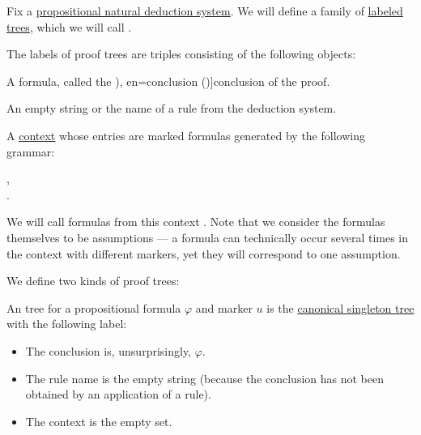 \begin{definition}\label{def:natural_deduction_proof_tree}\mimprovised
  Fix a \hyperref[def:abstract_natural_deduction_system]{propositional natural deduction system}. We will define a family of \hyperref[def:labeled_tree]{labeled trees}, which we will call .

  The labels of proof trees are triples consisting of the following objects:
  \begin{thmenum}[series=def:natural_deduction_proof_tree]
     A formula, called the \term[ru=conclusion (\cite[35]{TroelstraSchwichtenberg2000BasicProofTheory}), en=conclusion (\cite[36]{TroelstraSchwichtenberg2000BasicProofTheory})]{conclusion} of the proof.

     An empty string or the name of a rule from the deduction system.

     A \hyperref[def:logical_context]{context} whose entries are marked formulas generated by the following grammar:
    \begin{bnf*}
                {}, \\
        { \bnfsp \bnftsq{:} \bnfsp {}}.
    \end{bnf*}

    We will call formulas from this context . Note that we consider the formulas themselves to be assumptions --- a formula can technically occur several times in the context with different markers, yet they will correspond to one assumption.
  \end{thmenum}

  We define two kinds of proof trees:
  \begin{thmenum}[resume=def:natural_deduction_proof_tree]
     An  tree for a propositional formula \( \varphi \) and marker \( u \) is the \hyperref[def:canonical_singleton_tree]{canonical singleton tree} with the following label:
    \begin{itemize}
      \item The conclusion is, unsurprisingly, \( \varphi \).
      \item The rule name is the empty string (because the conclusion has not been obtained by an application of a rule).
      \item The context is the empty set.
    \end{itemize}


\end{thmenum}
\end{definition}
